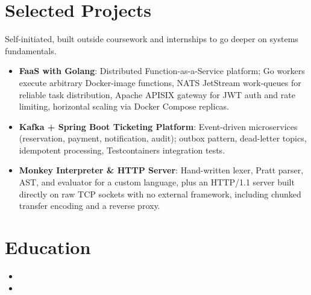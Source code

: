 \documentclass[11pt,a4paper,sans]{moderncv}
\begin{document}
\section{Selected Projects}
\vspace{1pt}
\small{Self-initiated, built outside coursework and internships to go deeper on systems fundamentals.}
\vspace{3pt}
\begin{itemize}

\item \textbf{FaaS with Golang}: Distributed Function-as-a-Service platform; Go workers execute arbitrary Docker-image functions, NATS JetStream work-queues for reliable task distribution, Apache APISIX gateway for JWT auth and rate limiting, horizontal scaling via Docker Compose replicas.

\item \textbf{Kafka + Spring Boot Ticketing Platform}: Event-driven microservices (reservation, payment, notification, audit); outbox pattern, dead-letter topics, idempotent processing, Testcontainers integration tests.

\item \textbf{Monkey Interpreter \& HTTP Server}: Hand-written lexer, Pratt parser, AST, and evaluator for a custom language, plus an HTTP/1.1 server built directly on raw TCP sockets with no external framework, including chunked transfer encoding and a reverse proxy.

\end{itemize}


\section{Education}
\vspace{1pt}
\begin{itemize}

\item{}

\vspace{3pt}

\item{}

\end{itemize}
\end{document}
